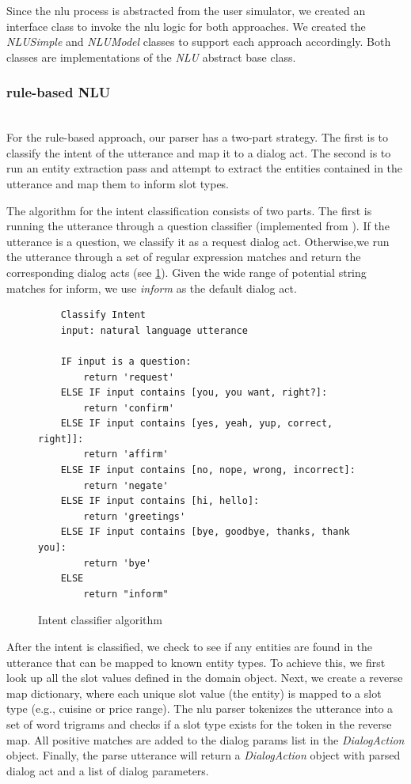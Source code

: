 Since the nlu process is abstracted from the user simulator, we created an interface class to invoke the nlu logic for both approaches. We created the \textit{NLUSimple} and \textit{NLUModel} classes to support each approach accordingly. Both classes are implementations of the\textit{ NLU} abstract base class. 

\subsubsection{rule-based NLU}
~ \\
For the rule-based approach, our parser has a two-part strategy. The first is to classify the intent of the utterance and map it to a dialog act. The second is to run an entity extraction pass and attempt to extract the entities contained in the utterance and map them to inform slot types.

The algorithm for the intent classification consists of two parts. The first is running the utterance through a question classifier (implemented from \cite{chewning_lord_yarvis_2015}). If the utterance is a question, we classify it as a request dialog act. Otherwise,we run the utterance through a set of regular expression matches and return the corresponding dialog acts (see \ref{fig:intent_clf}). Given the wide range of potential string matches for inform, we use \textit{inform} as the default dialog act. 

\begin{figure}[h!] 
	\label{fig:intent_clf}
	\begin{lstlisting}
	Classify Intent
	input: natural language utterance
	
	IF input is a question:
		return 'request'
	ELSE IF input contains [you, you want, right?]:
		return 'confirm'
	ELSE IF input contains [yes, yeah, yup, correct, right]]:
		return 'affirm'
	ELSE IF input contains [no, nope, wrong, incorrect]:
		return 'negate'
	ELSE IF input contains [hi, hello]:
		return 'greetings'
	ELSE IF input contains [bye, goodbye, thanks, thank you]:
		return 'bye'
	ELSE
		return "inform"
	\end{lstlisting}
	\caption{ Intent classifier algorithm}
\end{figure}

After the intent is classified, we check to see if any entities are found in the utterance that can be mapped to known entity types. To achieve this, we first look up all the slot values defined in the domain object. Next, we create a reverse map dictionary, where each unique slot value (the entity) is mapped to a slot type (e.g., cuisine or price range). The nlu parser tokenizes the utterance into a set of word trigrams and checks if a slot type exists for the token in the reverse map. All positive matches are added to the dialog params list in the \textit{DialogAction} object. Finally, the parse utterance will return a \textit{DialogAction} object with parsed dialog act and a list of dialog parameters. 

